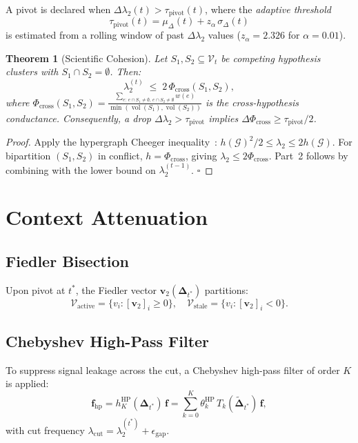 \documentclass[conference]{IEEEtran}
\newtheorem{theorem}{Theorem}
\DeclareMathOperator{\vol}{vol}
\newcommand{\lam}{\lambda_2}
\newcommand{\dlam}{\Delta\lambda_2}
\newcommand{\tpivot}{\tau_{\mathrm{pivot}}}
\newcommand{\Gcal}{\mathcal{G}}
\newcommand{\Vcal}{\mathcal{V}}
\newcommand{\Deltab}{\boldsymbol{\Delta}}
\newcommand{\vv}{\mathbf{v}}
\begin{document}
A pivot is declared when $\dlam(t) > \tpivot(t)$, where the
\emph{adaptive threshold}
\begin{equation}
  \tpivot(t) = \mu_\Delta(t) + z_\alpha\,\sigma_\Delta(t)
  \label{eq:adaptive}
\end{equation}
is estimated from a rolling window of past $\dlam$ values
($z_\alpha = 2.326$ for $\alpha=0.01$).

\begin{theorem}[Scientific Cohesion]\label{thm:cohesion}
Let $S_1,S_2\subseteq\Vcal_t$ be competing hypothesis clusters with
$S_1\cap S_2=\emptyset$. Then:
\begin{equation}
  \lam^{(t)} \;\leq\; 2\,\Phi_\mathrm{cross}(S_1,S_2),
  \label{eq:cohesion}
\end{equation}
where $\Phi_\mathrm{cross}(S_1,S_2) = \frac{\sum_{e:\,e\cap S_1\neq\emptyset,\,
e\cap S_2\neq\emptyset}w(e)}{\min(\vol(S_1),\vol(S_2))}$
is the cross-hypothesis conductance.
Consequently, a drop $\dlam > \tpivot$ implies
$\Delta\Phi_\mathrm{cross} \geq \tpivot/2$.
\end{theorem}
\begin{proof}
Apply the hypergraph Cheeger inequality~\cite{louis2015hypergraph}:
$h(\Gcal)^2/2 \leq \lam \leq 2h(\Gcal)$.
For bipartition $(S_1,S_2)$ in conflict, $h = \Phi_\mathrm{cross}$, giving
$\lam \leq 2\Phi_\mathrm{cross}$.
Part~2 follows by combining with the lower bound on $\lam^{(t-1)}$.
\hfill$\square$
\end{proof}

\section{Context Attenuation}\label{sec:attenuation}

\subsection{Fiedler Bisection}
Upon pivot at $t^*$, the Fiedler vector $\vv_2(\Deltab_{t^*})$ partitions:
\begin{equation}
  \Vcal_\mathrm{active} = \{v_i : [\vv_2]_i \geq 0\},\quad
  \Vcal_\mathrm{stale}  = \{v_i : [\vv_2]_i < 0\}.
  \label{eq:bisection}
\end{equation}

\subsection{Chebyshev High-Pass Filter}
To suppress signal leakage across the cut, a Chebyshev high-pass filter of
order $K$ is applied:
\begin{equation}
  \mathbf{f}_\mathrm{hp} = h_K^\mathrm{HP}(\Deltab_{t^*})\,\mathbf{f}
    = \sum_{k=0}^{K}\theta_k^\mathrm{HP}\,T_k(\tilde{\Deltab}_{t^*})\,\mathbf{f},
  \label{eq:chebfilter}
\end{equation}
with cut frequency $\lambda_\mathrm{cut} = \lam^{(t^*)} + \epsilon_\mathrm{gap}$.
\end{document}

